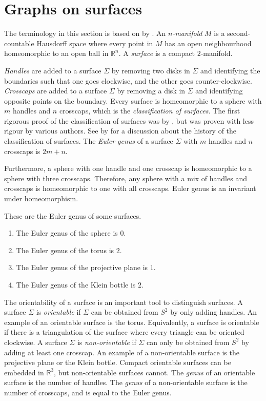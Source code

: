 \section{Graphs on surfaces}

The terminology in this section is based on  by \textcite{moharGraphsSurfaces2001}. An \textit{$n$-manifold} $M$ is a second-countable Hausdorff space where every point in $M$ has an open neighbourhood homeomorphic to an open ball in $\mathbb{R}^n$. A \textit{surface} is a compact $2$-manifold. 

\textit{Handles} are added to a surface \(\Sigma\) by removing two disks in \(\Sigma\) and identifying the boundaries such that one goes clockwise, and the other goes counter-clockwise. \textit{Crosscaps} are added to a surface $\Sigma$ by removing a disk in \(\Sigma\) and identifying opposite points on the boundary. Every surface is homeomorphic to a sphere with $m$ handles and $n$ crosscaps, which is the \textit{classification of surfaces}. The first rigorous proof of the classification of surfaces was by \textcite{brahanaSystemsCircuitsTwoDimensional1921}, but was proven with less rigour by various authors. See \cite{gallierClassificationTheoremCompact2013} by \citeauthor{gallierClassificationTheoremCompact2013} for a discussion about the history of the classification of surfaces. The \textit{Euler genus} of a surface \(\Sigma\) with $m$ handles and $n$ crosscaps is $2m + n$. 

Furthermore, a sphere with one handle and one crosscap is homeomorphic to a sphere with three crosscaps. Therefore, any sphere with a mix of handles and crosscaps is homeomorphic to one with all crosscaps. Euler genus is an invariant under homeomorphism. 

These are the Euler genus of some surfaces.
\begin{enumerate}
	\item The Euler genus of the sphere is \(0\).
	\item The Euler genus of the torus is \(2\).
	\item The Euler genus of the projective plane is \(1\). 
	\item The Euler genus of the Klein bottle is \(2\). 
\end{enumerate}

The orientability of a surface is an important tool to distinguish surfaces. A surface \(\Sigma\) is \textit{orientable} if \(\Sigma\) can be obtained from \(S^2\) by only adding handles. An example of an orientable surface is the torus. Equivalently, a surface is orientable if there is a triangulation of the surface where every triangle can be oriented clockwise. A surface \(\Sigma\) is \textit{non-orientable} if \(\Sigma\) can only be obtained from \(S^2\) by adding at least one crosscap. An example of a non-orientable surface is the projective plane or the Klein bottle. Compact orientable surfaces can be embedded in $\mathbb{R}^3$, but non-orientable surfaces cannot. The \textit{genus} of an orientable surface is the number of handles. The \textit{genus} of a non-orientable surface is the number of crosscaps, and is equal to the Euler genus. 

